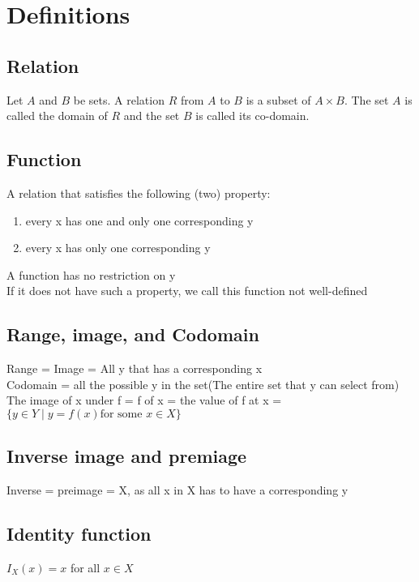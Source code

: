 \documentclass[a4paper]{article}
\begin{document}
\maketitle
\section{Definitions}
\subsection{Relation}
Let $A$ and $B$ be sets. A relation $R$ from $A$ to $B$ is a subset of $A \times B$. The set $A$ is called the domain of $R$ and the set $B$ is called its co-domain.
\subsection{Function}
A relation that satisfies the following (two) property:
\begin{enumerate}
    \item every x has one and only one corresponding y
    \item every x has only one corresponding y
\end{enumerate}
\begin{remark}
    A function has no restriction on y\\
    If it does not have such a property, we call this function not well-defined
\end{remark}

\subsection{Range, image, and Codomain}
Range = Image = All y that has a corresponding x\\
Codomain = all the possible y in the set(The entire set that y can select from)\\
The image of x under f = f of x = the value of f at x = $\{y \in Y\mid y = f(x) \text{for some } x \in X\}$

\subsection{Inverse image and premiage}
Inverse = preimage = X, as all x in X has to have a corresponding y

\subsection{Identity function}
$I_X(x) = x$ for all $x \in X$
\end{document}
